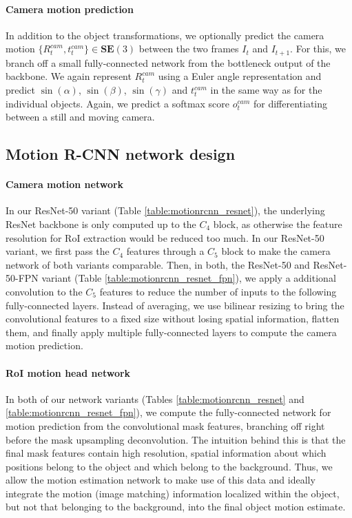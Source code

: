 \paragraph{Camera motion prediction}
In addition to the object transformations, we optionally predict the camera motion $\{R_t^{cam}, t_t^{cam}\}\in \mathbf{SE}(3)$
between the two frames $I_t$ and $I_{t+1}$.
For this, we branch off a small fully-connected network from the bottleneck output of the backbone.
We again represent $R_t^{cam}$ using a Euler angle representation and
predict $\sin(\alpha)$, $\sin(\beta)$, $\sin(\gamma)$ and $t_t^{cam}$ in the same way as for the individual objects.
Again, we predict a softmax score $o_t^{cam}$ for differentiating between
a still and moving camera.

\subsection{Motion R-CNN network design}

\label{ssec:design}
\paragraph{Camera motion network}
In our ResNet-50 variant (Table \ref{table:motionrcnn_resnet}), the underlying
ResNet backbone is only computed up to the $C_4$ block, as otherwise the
feature resolution for RoI extraction would be reduced too much.
In our ResNet-50 variant, we first pass the $C_4$ features through a $C_5$
block to make the camera network of both variants comparable.
Then, in both, the ResNet-50 and ResNet-50-FPN variant (Table \ref{table:motionrcnn_resnet_fpn}), we apply a additional
convolution to the $C_5$ features to reduce the number of inputs to the following
fully-connected layers.
Instead of averaging, we use bilinear resizing to bring the convolutional features
to a fixed size without losing spatial information,
flatten them, and finally apply multiple fully-connected layers to compute the
camera motion prediction.

\paragraph{RoI motion head network}
In both of our network variants
(Tables \ref{table:motionrcnn_resnet} and \ref{table:motionrcnn_resnet_fpn}),
we compute the fully-connected network for motion prediction from the
convolutional mask features, branching off right before the mask upsampling
deconvolution. The intuition behind this is that the final mask features contain
high resolution, spatial information about which positions belong to the object and
which belong to the background. Thus, we allow the motion estimation network to
make use of this data and ideally integrate the motion (image matching) information
localized within the object, but not that belonging to the background,
into the final object motion estimate.


